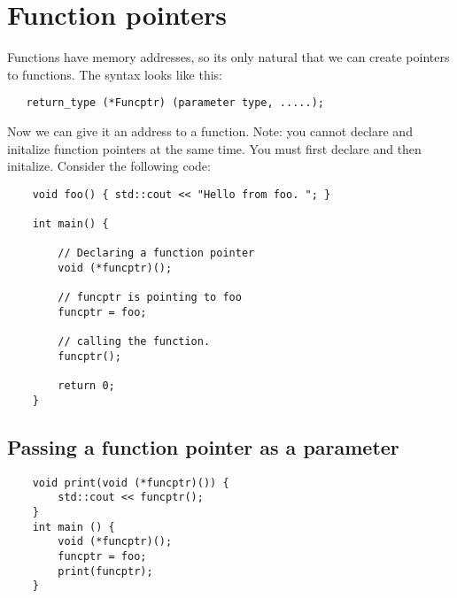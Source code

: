 \documentclass{report}
\begin{document}
    \section{Function pointers}
    Functions have memory addresses, so its only natural that we can create pointers to functions. The syntax looks like this:
    \begin{verbatim}
   return_type (*Funcptr) (parameter type, .....);
    \end{verbatim}
    Now we can give it an address to a function. Note: you cannot declare and initalize function pointers at the same time. You must first declare and then initalize. Consider the following code:
    \begin{verbatim}
    void foo() { std::cout << "Hello from foo. "; }

    int main() {

        // Declaring a function pointer
        void (*funcptr)();
        
        // funcptr is pointing to foo
        funcptr = foo;

        // calling the function.
        funcptr();

        return 0;
    }
    \end{verbatim}
    \subsection{Passing a function pointer as a parameter}
    \begin{verbatim}
    void print(void (*funcptr)()) {
        std::cout << funcptr();
    }
    int main () {
        void (*funcptr)();
        funcptr = foo;
        print(funcptr);
    }
    \end{verbatim}
\end{document}
